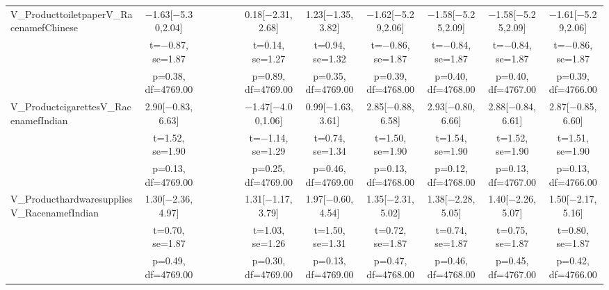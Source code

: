 \documentclass[]{report}
\begin{document}
\begin{table}
{\begin{tabular}[t]{lccccccccccc}
		V\_ProducttoiletpaperV\_RacenamefChinese & \num{-1.63}[\num{-5.30},\num{2.04}] &  &  &  &  & \num{0.18}[\num{-2.31},\num{2.68}] & \num{1.23}[\num{-1.35},\num{3.82}] & \num{-1.62}[\num{-5.29},\num{2.06}] & \num{-1.58}[\num{-5.25},\num{2.09}] & \num{-1.58}[\num{-5.25},\num{2.09}] & \num{-1.61}[\num{-5.29},\num{2.06}]\\
		& t=\num{-0.87}, se=\num{1.87} &  &  &  &  & t=\num{0.14}, se=\num{1.27} & t=\num{0.94}, se=\num{1.32} & t=\num{-0.86}, se=\num{1.87} & t=\num{-0.84}, se=\num{1.87} & t=\num{-0.84}, se=\num{1.87} & t=\num{-0.86}, se=\num{1.87}\\
		& p=\num{0.38}, df=\num{4769.00} &  &  &  &  & p=\num{0.89}, df=\num{4769.00} & p=\num{0.35}, df=\num{4769.00} & p=\num{0.39}, df=\num{4768.00} & p=\num{0.40}, df=\num{4768.00} & p=\num{0.40}, df=\num{4767.00} & p=\num{0.39}, df=\num{4766.00}\\
		V\_ProductcigarettesV\_RacenamefIndian & \num{2.90}[\num{-0.83},\num{6.63}] &  &  &  &  & \num{-1.47}[\num{-4.00},\num{1.06}] & \num{0.99}[\num{-1.63},\num{3.61}] & \num{2.85}[\num{-0.88},\num{6.58}] & \num{2.93}[\num{-0.80},\num{6.66}] & \num{2.88}[\num{-0.84},\num{6.61}] & \num{2.87}[\num{-0.85},\num{6.60}]\\
		& t=\num{1.52}, se=\num{1.90} &  &  &  &  & t=\num{-1.14}, se=\num{1.29} & t=\num{0.74}, se=\num{1.34} & t=\num{1.50}, se=\num{1.90} & t=\num{1.54}, se=\num{1.90} & t=\num{1.52}, se=\num{1.90} & t=\num{1.51}, se=\num{1.90}\\
		& p=\num{0.13}, df=\num{4769.00} &  &  &  &  & p=\num{0.25}, df=\num{4769.00} & p=\num{0.46}, df=\num{4769.00} & p=\num{0.13}, df=\num{4768.00} & p=\num{0.12}, df=\num{4768.00} & p=\num{0.13}, df=\num{4767.00} & p=\num{0.13}, df=\num{4766.00}\\
		V\_ProducthardwaresuppliesV\_RacenamefIndian & \num{1.30}[\num{-2.36},\num{4.97}] &  &  &  &  & \num{1.31}[\num{-1.17},\num{3.79}] & \num{1.97}[\num{-0.60},\num{4.54}] & \num{1.35}[\num{-2.31},\num{5.02}] & \num{1.38}[\num{-2.28},\num{5.05}] & \num{1.40}[\num{-2.26},\num{5.07}] & \num{1.50}[\num{-2.17},\num{5.16}]\\
		& t=\num{0.70}, se=\num{1.87} &  &  &  &  & t=\num{1.03}, se=\num{1.26} & t=\num{1.50}, se=\num{1.31} & t=\num{0.72}, se=\num{1.87} & t=\num{0.74}, se=\num{1.87} & t=\num{0.75}, se=\num{1.87} & t=\num{0.80}, se=\num{1.87}\\
		& p=\num{0.49}, df=\num{4769.00} &  &  &  &  & p=\num{0.30}, df=\num{4769.00} & p=\num{0.13}, df=\num{4769.00} & p=\num{0.47}, df=\num{4768.00} & p=\num{0.46}, df=\num{4768.00} & p=\num{0.45}, df=\num{4767.00} & p=\num{0.42}, df=\num{4766.00}\\

\end{tabular}}
\end{table}
\end{document}

